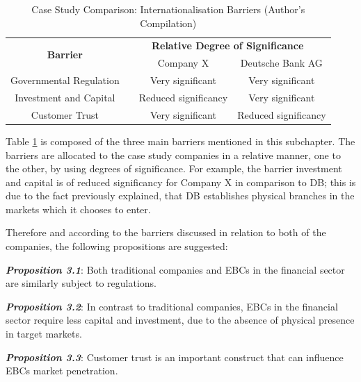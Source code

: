 \documentclass[11pt,a4paper]{article}
\begin{document}
{{{\vspace{8mm}
\begin{table}[H] \centering 
\begin{tabular}{c l c c}
    \toprule
    \multirow{2}{*}{\bfseries Barrier} & 
    \multicolumn{3}{c}{\bfseries Relative Degree of Significance}\\ \cmidrule(lr){3-4}
    && Company X&Deutsche Bank AG \\ \cmidrule(lr){1-4}
    Governmental Regulation&  & Very significant & Very significant \\
    Investment and Capital & & Reduced significancy  & Very significant\\
     Customer Trust &  & Very significant & Reduced significancy\\
    \bottomrule
\end{tabular}
\vspace{5mm}
\captionsetup{width=0.85\linewidth}
\caption{Case Study Comparison: Internationalisation Barriers (Author's Compilation)} 
\label{table:int_barriers_comp}
\end{table} 

Table \ref{table:int_barriers_comp} is composed of the three main barriers mentioned in this subchapter. The barriers are allocated to the case study companies in a relative manner, one to the other, by using degrees of significance. For example, the barrier investment and capital is of reduced significancy for Company X in comparison to DB; this is due to the fact previously explained, that DB establishes physical branches in the markets which it chooses to enter. \par
Therefore and according to the barriers discussed in relation to both of the companies, the following propositions are suggested:

\begin{center}
\textbf{\textit{Proposition 3.1}}: Both traditional companies and EBCs in the financial sector are similarly subject to regulations.
\end{center}
\begin{center}
\textbf{\textit{Proposition 3.2}}: In contrast to traditional companies, EBCs in the financial sector require less capital and investment, due to the absence of physical presence in target markets.
\end{center}
\begin{center}
\textbf{\textit{Proposition 3.3}}: Customer trust is an important construct that can influence EBCs market penetration.
\end{center}



}}}
\end{document}
